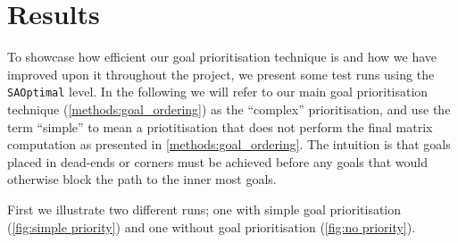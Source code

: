 \section{Results}
\label{sec:results}


To showcase how efficient our goal prioritisation technique is and how we have improved upon it throughout the project, we present some test runs using the \texttt{SAOptimal} level.
In the following we will refer to our main goal prioritisation technique (\cref{methods:goal_ordering}) as the ``complex'' prioritisation, and use the term ``simple'' to mean a priotitisation that does not perform the final matrix computation as presented in \cref{methods:goal_ordering}.
The intuition is that goals placed in dead-ends or corners must be achieved before any goals that would otherwise block the path to the inner most goals.

First we illustrate two different runs; one with simple goal prioritisation (\cref{fig:simple priority}) and one without goal prioritisation (\cref{fig:no priority}).


